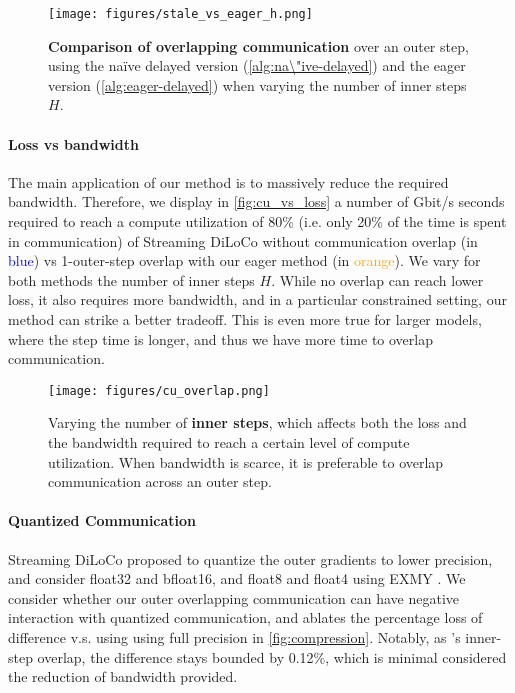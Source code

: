 \begin{figure}[t]
\centering
  \texttt{[image: figures/stale\_vs\_eager\_h.png]}
  \caption{\textbf{Comparison of overlapping communication} over an outer step, using the na\"ive delayed version (\autoref{alg:na\"ive-delayed}) and the eager version (\autoref{alg:eager-delayed}) when varying the number of inner steps $H$.}
  \label{fig:stale_vs_eager}
\end{figure}

\paragraph{Loss vs bandwidth} The main application of our method is to massively reduce the required bandwidth. Therefore, we display in \autoref{fig:cu_vs_loss} a number of Gbit/s seconds required to reach a compute utilization of 80\% (i.e. only 20\% of the time is spent in communication) of Streaming DiLoCo without communication overlap (in \textcolor{blue}{blue}) vs 1-outer-step overlap with our eager method (in \textcolor{orange}{orange}). We vary for both methods the number of inner steps $H$. While no overlap can reach lower loss, it also requires more bandwidth, and in a particular constrained setting, our method can strike a better tradeoff. This is even more true for larger models, where the step time is longer, and thus we have more time to overlap communication.

\begin{figure}[t]
\centering
  \texttt{[image: figures/cu\_overlap.png]}
  \caption{Varying the number of \textbf{inner steps}, which affects both the loss and the bandwidth required to reach a certain level of compute utilization. When bandwidth is scarce, it is preferable to overlap communication across an outer step.}
  \label{fig:cu_vs_loss}
\end{figure}

\paragraph{Quantized Communication} Streaming DiLoCo \citep{douillard2025streamingdiloco} proposed to quantize the outer gradients to lower precision, and consider float32 and bfloat16, and float8 and float4 using EXMY \citep{agrawal2024exmy}. We consider whether our outer overlapping communication can have negative interaction with quantized communication, and ablates the percentage loss of difference v.s. using using full precision in \autoref{fig:compression}. Notably, as \cite{douillard2025streamingdiloco}'s inner-step overlap, the difference stays bounded by 0.12\%, which is minimal considered the reduction of bandwidth provided.

